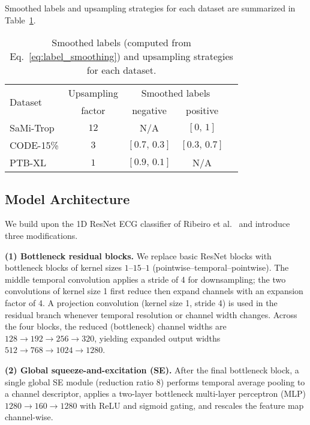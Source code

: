 \documentclass[twocolumn]{cinc}
\begin{document}
Smoothed labels and upsampling strategies for each dataset are summarized in Table~\ref{tab:augmentation}.


\begin{table}[!htp]
\centering
\begin{tabular}{lcccc}
\toprule
\multirow{2}{*}{Dataset} & Upsampling & \multicolumn{2}{c}{Smoothed labels} \\ \cmidrule(lr){3-4}
& factor & negative & positive \\
\midrule
SaMi-Trop & $12$ & N/A           & $[0,\,1]$     \\
CODE-15\% & $3$ & $[0.7,\,0.3]$ & $[0.3,\,0.7]$ \\
PTB-XL    & $1$ & $[0.9,\,0.1]$ & N/A           \\
\bottomrule
\end{tabular}
\caption{Smoothed labels (computed from Eq.~\ref{eq:label_smoothing}) and upsampling strategies for each dataset.}
\label{tab:augmentation}
\end{table}


\subsection{Model Architecture}
\label{subsec:model}


We build upon the 1D ResNet ECG classifier of Ribeiro et al.~\cite{ribeiro2020automatic} and introduce three modifications.

\textbf{(1) Bottleneck residual blocks.} We replace basic ResNet blocks with bottleneck blocks of kernel sizes $1$–$15$–$1$ (pointwise--temporal--pointwise). The middle temporal convolution applies a stride of 4 for downsampling; the two convolutions of kernel size 1 first reduce then expand channels with an expansion factor of 4. A projection convolution (kernel size 1, stride 4) is used in the residual branch whenever temporal resolution or channel width changes. Across the four blocks, the reduced (bottleneck) channel widths are $128 \to 192 \to 256 \to 320$, yielding expanded output widths $512 \to 768 \to 1024 \to 1280$.

\textbf{(2) Global squeeze-and-excitation (SE).} After the final bottleneck block, a single global SE module (reduction ratio 8) \cite{hu2018senet} performs temporal average pooling to a channel descriptor, applies a two-layer bottleneck multi-layer perceptron (MLP) $1280 \to 160 \to 1280$ with ReLU and sigmoid gating, and rescales the feature map channel-wise.
\end{document}
